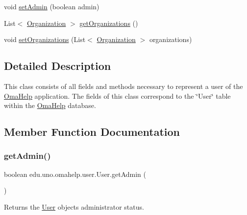 \begin{DoxyCompactItemize}
void \mbox{\hyperlink{classedu_1_1uno_1_1omahelp_1_1user_1_1_user_a736da37e28c9a538ac0ce74f44328d96}{set\+Admin}} (boolean admin)
\item 
List$<$ \mbox{\hyperlink{classedu_1_1uno_1_1omahelp_1_1organization_1_1_organization}{Organization}} $>$ \mbox{\hyperlink{classedu_1_1uno_1_1omahelp_1_1user_1_1_user_ab42cf247eaa6bf7fe736b9faf25fdec0}{get\+Organizations}} ()
\item 
void \mbox{\hyperlink{classedu_1_1uno_1_1omahelp_1_1user_1_1_user_abb733bedac2ba4ae82096938e93cf203}{set\+Organizations}} (List$<$ \mbox{\hyperlink{classedu_1_1uno_1_1omahelp_1_1organization_1_1_organization}{Organization}} $>$ organizations)
\end{DoxyCompactItemize}


\subsection{Detailed Description}
This class consists of all fields and methods necessary to represent a user of the \mbox{\hyperlink{classedu_1_1uno_1_1omahelp_1_1_oma_help}{Oma\+Help}} application. The fields of this class correspond to the \char`\"{}\+User\char`\"{} table within the \mbox{\hyperlink{classedu_1_1uno_1_1omahelp_1_1_oma_help}{Oma\+Help}} database. 

\subsection{Member Function Documentation}
\mbox{\label{classedu_1_1uno_1_1omahelp_1_1user_1_1_user_afada28e82c04dede8419dd44e87e885d}} 
\subsubsection{\texorpdfstring{get\+Admin()}{getAdmin()}}
{\footnotesize\ttfamily boolean edu.\+uno.\+omahelp.\+user.\+User.\+get\+Admin (\begin{DoxyParamCaption}{ }\end{DoxyParamCaption})}

Returns the \mbox{\hyperlink{classedu_1_1uno_1_1omahelp_1_1user_1_1_user}{User}} object\textquotesingle{}s administrator status.

